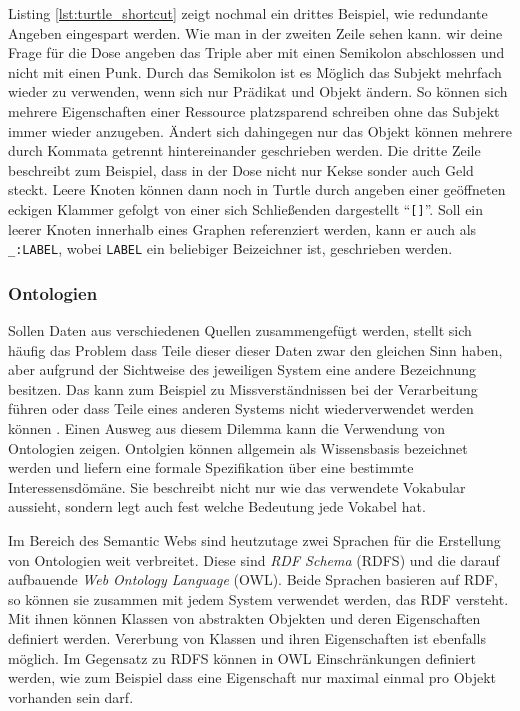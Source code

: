 Listing \ref{lst:turtle_shortcut} zeigt nochmal ein drittes Beispiel, wie redundante Angeben eingespart werden. Wie man in der zweiten Zeile sehen kann. wir deine Frage für die Dose angeben das Triple aber mit einen Semikolon abschlossen und nicht mit einen Punk. Durch das Semikolon ist es Möglich das Subjekt mehrfach wieder zu verwenden, wenn sich nur Prädikat und Objekt ändern. So können sich mehrere Eigenschaften einer Ressource platzsparend schreiben ohne das Subjekt immer wieder anzugeben. Ändert sich dahingegen nur das Objekt können mehrere durch Kommata getrennt hintereinander geschrieben werden. Die dritte Zeile beschreibt zum Beispiel, dass in der Dose nicht nur Kekse sonder auch Geld steckt. Leere Knoten können dann noch in Turtle durch angeben einer geöffneten eckigen Klammer gefolgt von einer sich Schließenden dargestellt \enquote{\texttt{[]}}. Soll ein leerer Knoten innerhalb eines Graphen referenziert werden, kann er auch als \texttt{\_:LABEL}, wobei \texttt{LABEL} ein beliebiger Beizeichner ist, geschrieben werden.



\subsubsection{Ontologien} %
\label{ssub:ontologien}

Sollen Daten aus verschiedenen Quellen zusammengefügt werden, stellt sich häufig das Problem dass Teile dieser dieser Daten zwar den gleichen Sinn haben, aber aufgrund der Sichtweise des jeweiligen System eine andere Bezeichnung besitzen. Das kann zum Beispiel zu Missverständnissen bei der Verarbeitung führen oder dass Teile eines anderen Systems nicht wiederverwendet werden können \cite{Uschold1996}. Einen Ausweg aus diesem Dilemma kann die Verwendung von Ontologien zeigen. Ontolgien können allgemein als Wissensbasis \cite{Uschold1996,Hitzler2008a} bezeichnet werden und liefern eine formale Spezifikation über eine bestimmte Interessensdömäne. Sie beschreibt nicht nur wie das verwendete Vokabular aussieht, sondern legt auch fest welche Bedeutung jede Vokabel hat. 

\medskip

Im Bereich des Semantic Webs sind heutzutage zwei Sprachen für die Erstellung von Ontologien weit verbreitet. Diese sind \emph{RDF Schema} (RDFS)\cite{Brickley} und die darauf aufbauende \emph{Web Ontology Language} (OWL)\cite{partelschneider2004}. Beide Sprachen basieren auf RDF, so können sie zusammen mit jedem System verwendet werden, das RDF versteht. Mit ihnen können Klassen von abstrakten Objekten und deren Eigenschaften definiert werden. Vererbung von Klassen und ihren Eigenschaften ist ebenfalls möglich. Im Gegensatz zu RDFS können in OWL Einschränkungen definiert werden, wie zum Beispiel dass eine Eigenschaft nur maximal einmal pro Objekt vorhanden sein darf. 

